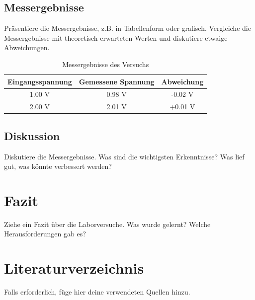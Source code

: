 \documentclass[a4paper,12pt]{article}
\begin{document}
\subsection{Messergebnisse}
Präsentiere die Messergebnisse, z.B. in Tabellenform oder grafisch. Vergleiche die Messergebnisse mit theoretisch erwarteten Werten und diskutiere etwaige Abweichungen.

\begin{table}[H]
    \centering
    \begin{tabular}{|c|c|c|}
        \hline
        Eingangsspannung & Gemessene Spannung & Abweichung \\
        \hline
        1.00 V & 0.98 V & -0.02 V \\
        2.00 V & 2.01 V & +0.01 V \\
        \hline
    \end{tabular}
    \caption{Messergebnisse des Versuchs}
\end{table}

\subsection{Diskussion}
Diskutiere die Messergebnisse. Was sind die wichtigsten Erkenntnisse? Was lief gut, was könnte verbessert werden?

\section{Fazit}
Ziehe ein Fazit über die Laborversuche. Was wurde gelernt? Welche Herausforderungen gab es? 

\section*{Literaturverzeichnis}
Falls erforderlich, füge hier deine verwendeten Quellen hinzu.
\end{document}
